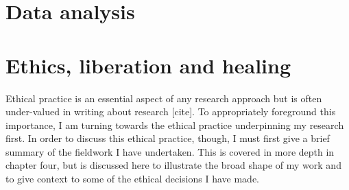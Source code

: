 











\section{Data analysis}


\section{Ethics, liberation and healing}
\label{3-ethics}
Ethical practice is an essential aspect of any research approach but is often under-valued in writing about research [cite]. To appropriately foreground this importance, I am turning towards the ethical practice underpinning my research first. In order to discuss this ethical practice, though, I must first give a brief summary of the fieldwork I have undertaken. This is covered in more depth in chapter four, but is discussed here to illustrate the broad shape of my work and to give context to some of the ethical decisions I have made.

